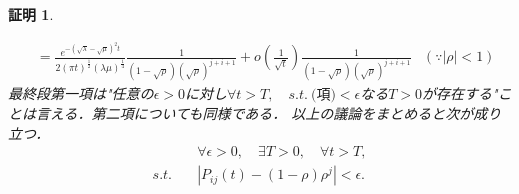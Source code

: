 \documentclass[a4j,papersize,disablejfam,slide,14pt]{jsarticle}
\newtheorem{Proof}{証明}
\def\exp#1{e^{#1}} %
\begin{document}
\begin{Proof}
\begin{description}
\begin{align}
                    &= \frac{ \exp{-(\sqrt{\lambda}-\sqrt{\mu})^2 t} }{ 2(\pi t)^\frac{1}{2} (\lambda \mu)^\frac{1}{4} } \frac{1}{(1-\sqrt{\rho})(\sqrt{\rho})^{j+i+1}} 
                    	+ o\left( \frac{1}{\sqrt{t}} \right) \frac{1}{(1-\sqrt{\rho})(\sqrt{\rho})^{j+i+1}} & (\because |\rho| < 1)
                \end{align}
                最終段第一項は"任意の$\epsilon > 0$に対し$\forall t > T,\quad s.t.\ \mbox{(項)} < \epsilon$なる$T > 0$が存在する"ことは言える．第二項についても同様である．
                以上の議論をまとめると次が成り立つ．
                \begin{align}
                	&\forall \epsilon > 0,\quad \exists T > 0,\quad \forall t > T, \\
                	s.t.\quad& \left| P_{ij}(t) - (1-\rho)\rho^j \right| < \epsilon.
                \end{align}
            

\end{description}
\end{Proof}
\end{document}
